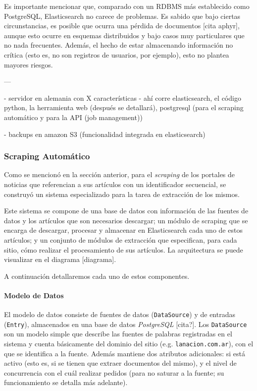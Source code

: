 Es importante mencionar que, comparado con un RDBMS más establecido como PostgreSQL, Elasticsearch
no carece de problemas. Es sabido que bajo ciertas circunstancias, es posible que ocurra una pérdida
de documentos [cita aphyr], aunque esto ocurre en esquemas distribuidos y bajo casos muy
particulares que no nada frecuentes. Además, el hecho de estar almacenando información no crítica
(esto es, no son registros de usuarios, por ejemplo), esto no plantea mayores riesgos.

---

- servidor en alemania con X características
- ahí corre elasticsearch, el código python, la herramienta web (después se detallará),
  postgresql (para el scraping automático y para la API (job management))

- backups en amazon S3 (funcionalidad integrada en elasticsearch)


\subsubsection{Scraping Automático}

Como se mencionó en la sección anterior, para el \textit{scraping} de los portales de noticias que
referencian a sus artículos con un identificador secuencial, se construyó un sistema especializado
para la tarea de extracción de los mismos.

Este sistema se compone de una base de datos con información de las fuentes de datos y los
artículos que son necesarios descargar; un módulo de scraping que se encarga de descargar, procesar
y almacenar en Elasticsearch cada uno de estos artículos; y un conjunto de módulos de extracción que
especifican, para cada sitio, cómo realizar el procesamiento de sus artículos. La arquitectura se
puede visualizar en el diagrama [diagrama].

A continuación detallaremos cada uno de estos componentes.


\paragraph{Modelo de Datos}

El modelo de datos consiste de fuentes de datos (\texttt{DataSource}) y de entradas
(\texttt{Entry}), almacenados en una base de datos \textit{PostgreSQL} [cita?]. Los
\texttt{DataSource} son un modelo simple que describe las fuentes de palabras registradas en el
sistema y cuenta básicamente del dominio del sitio (e.g. \texttt{lanacion.com.ar}), con el que se
identifica a la fuente. Además mantiene dos atributos adicionales: si está activo (esto es, si se
tienen que extraer documentos del mismo), y el nivel de concurrencia con el cuál realizar pedidos
(para no saturar a la fuente; su funcionamiento se detalla más adelante).

